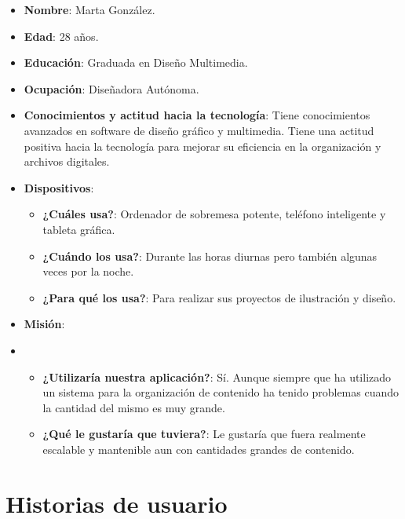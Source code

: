     \begin{itemize}
        \item \textbf{Nombre}: Marta González.
        \item \textbf{Edad}: 28 años.
        \item \textbf{Educación}: Graduada en Diseño Multimedia.
        \item \textbf{Ocupación}: Diseñadora Autónoma.
        \item \textbf{Conocimientos y actitud hacia la tecnología}: Tiene conocimientos avanzados en software de diseño gráfico y multimedia. Tiene una actitud positiva hacia la tecnología para mejorar su eficiencia en la organización y archivos digitales.
        \item \textbf{Dispositivos}:
            \begin{itemize}

            \item \textbf{¿Cuáles usa?}: Ordenador de sobremesa potente, teléfono inteligente y tableta gráfica.
            \item \textbf{¿Cuándo los usa?}: Durante las horas diurnas pero también algunas veces por la noche.
            \item \textbf{¿Para qué los usa?}: Para realizar sus proyectos de ilustración y diseño.

            \end{itemize}
        \item \textbf{Misión}:
        \item 
            \begin{itemize}

                \item \textbf{¿Utilizaría nuestra aplicación?}: Sí. Aunque siempre que ha utilizado un sistema para la organización de contenido ha tenido problemas cuando la cantidad del mismo es muy grande.

                \item \textbf{¿Qué le gustaría que tuviera?}: Le gustaría que fuera realmente escalable y mantenible aun con cantidades grandes de contenido.

            \end{itemize}
        
    \end{itemize}


\section{Historias de usuario}

